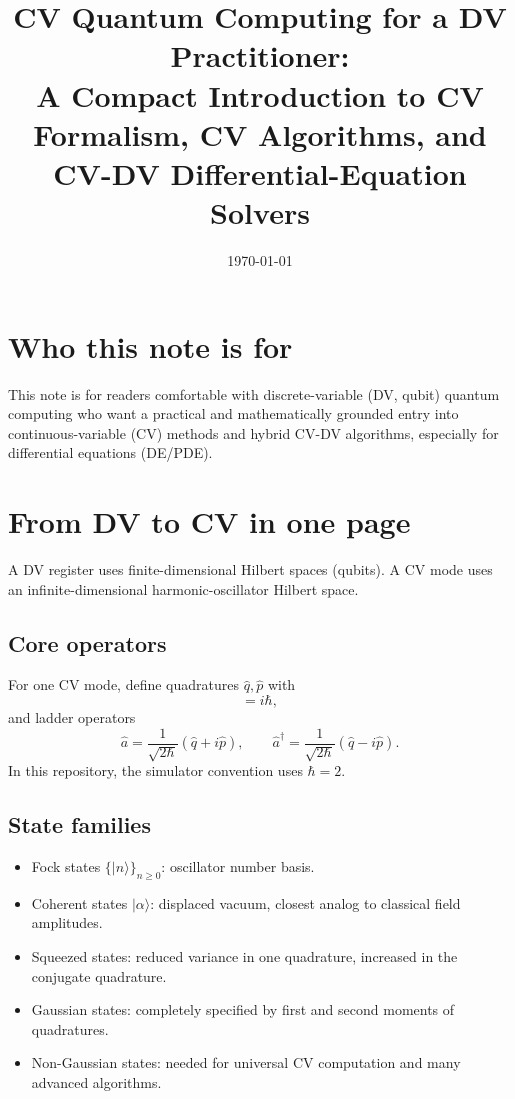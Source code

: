 \documentclass[11pt]{article}
\title{CV Quantum Computing for a DV Practitioner:\\
A Compact Introduction to CV Formalism, CV Algorithms, and CV-DV Differential-Equation Solvers}
\author{}
\date{\today}
\begin{document}
\maketitle

\section*{Who this note is for}
This note is for readers comfortable with discrete-variable (DV, qubit) quantum computing who want a practical and mathematically grounded entry into continuous-variable (CV) methods and hybrid CV-DV algorithms, especially for differential equations (DE/PDE).

\section{From DV to CV in one page}
A DV register uses finite-dimensional Hilbert spaces (qubits). A CV mode uses an infinite-dimensional harmonic-oscillator Hilbert space.

\subsection*{Core operators}
For one CV mode, define quadratures $\hat q,\hat p$ with
\begin{equation}
[\hat q,\hat p]=i\hbar,
\end{equation}
and ladder operators
\begin{equation}
\hat a = \frac{1}{\sqrt{2\hbar}}(\hat q+i\hat p),
\qquad
\hat a^\dagger = \frac{1}{\sqrt{2\hbar}}(\hat q-i\hat p).
\end{equation}
In this repository, the simulator convention uses $\hbar=2$.

\subsection*{State families}
\begin{itemize}
\item Fock states $\{|n\rangle\}_{n\ge 0}$: oscillator number basis.
\item Coherent states $|\alpha\rangle$: displaced vacuum, closest analog to classical field amplitudes.
\item Squeezed states: reduced variance in one quadrature, increased in the conjugate quadrature.
\item Gaussian states: completely specified by first and second moments of quadratures.
\item Non-Gaussian states: needed for universal CV computation and many advanced algorithms.
\end{itemize}
\end{document}
